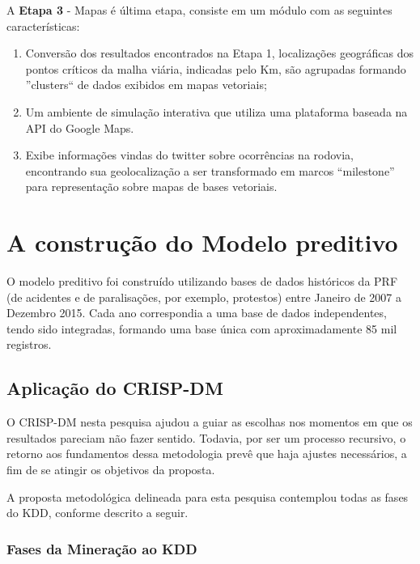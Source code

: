 A \textbf{Etapa 3} - Mapas é última etapa, consiste em um módulo com as seguintes características:
  \begin{enumerate}
    \item Conversão dos resultados encontrados na Etapa 1, localizações geográficas dos pontos críticos da malha viária, indicadas pelo Km, são agrupadas formando ''clusters`` de dados exibidos em mapas vetoriais;
    
    \item Um ambiente de simulação interativa que utiliza uma plataforma baseada na API do Google Maps.
    
    \item Exibe informações vindas do twitter sobre ocorrências na rodovia, encontrando sua geolocalização a ser transformado em marcos ``milestone'' para representação sobre mapas de bases vetoriais.
  \end{enumerate}
 
\pagebreak 

\section{A construção do Modelo preditivo}

O modelo preditivo foi construído utilizando bases de dados históricos da PRF (de acidentes e de paralisações, por exemplo,  protestos) entre Janeiro de 2007 a Dezembro 2015. Cada ano correspondia a uma base de dados independentes, tendo sido integradas, formando uma base única com aproximadamente 85 mil registros. 


\subsection{Aplicação do CRISP-DM}
O CRISP-DM nesta pesquisa ajudou a guiar as escolhas nos momentos em que os resultados pareciam não fazer sentido. Todavia, por ser um processo recursivo, o retorno aos fundamentos dessa metodologia prevê que haja ajustes necessários, a fim de se atingir os objetivos da proposta.

A proposta metodológica delineada para esta pesquisa contemplou todas as fases do KDD, conforme descrito a seguir.

\vspace{5mm}

\subsubsection{Fases da Mineração ao KDD}


